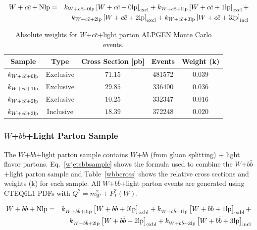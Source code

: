 \begin{eqnarray}
\label{wcc}
\nonumber
W+c\bar{c}+\rm{Nlp} &=& k_{W+c\bar{c}+0\rm{lp}} \left[W+c\bar{c}+0\rm{lp}\right]_{\rm{excl}} + k_{W+c\bar{c}+1\rm{lp}} \left[W+c\bar{c}+1\rm{lp}\right]_{\rm{excl}} + \\
& & k_{W+c\bar{c}+2\rm{lp}} \left[W+c\bar{c}+2\rm{lp}\right]_{\rm{excl}} + k_{W+c\bar{c}+3\rm{lp}} \left[W+c\bar{c}+3\rm{lp}\right]_{\rm{incl}}
\end{eqnarray}


\begin{table}[!h!tbp]
\begin{center}
\caption{Absolute weights for $W$+$c\bar{c}$+light parton ALPGEN Monte Carlo events.}
\label{wcccross}
\begin{tabular}{c|cccc}
Sample					&	Type		&	Cross Section [pb]	&	Events	&	Weight (k) \\
\hline
$k_{W+c\bar{c}+0\rm{lp}}$	&	Exclusive	&	$71.15$			&	481572	&	$0.039$			\\
$k_{W+c\bar{c}+1\rm{lp}}$	&	Exclusive	&	$29.85$			&	336400	&	$0.036$			\\
$k_{W+c\bar{c}+2\rm{lp}}$	&	Exclusive	&	$10.25$			&	332347	&	$0.016$	\\
$k_{W+c\bar{c}+3\rm{lp}}$	&	Inclusive	&	$18.39$			&	372248	&	$0.020$	\\
\end{tabular}
\vspace{-0.1 in}
\end{center}
\end{table}

\subsubsection{$W$+$b\bar{b}$+Light Parton Sample}

The $W$+$b\bar{b}$+light parton sample contains $W$+$b\bar{b}$ (from gluon splitting) + light flavor partons. Eq.~\ref{wjetsbbsample} shows the formula used to combine the $W$+$b\bar{b}$+light parton sample and Table~\ref{wbbcross} shows the relative cross sections and weights (k) for each sample. All $W$+$b\bar{b}$+light parton events are generated using CTEQ6L1 PDFs with $Q^{2}=m_{W}^{2} + P^{2}_{T}(W)$.


\begin{eqnarray}
\label{wjetsbbsample}
\nonumber
W+b\bar{b}+\rm{Nlp} &=& k_{W+b\bar{b}+0\rm{lp}} \left[W+b\bar{b}+0\rm{lp}\right]_{\rm{exbl}} + k_{W+b\bar{b}+1\rm{lp}} \left[W+b\bar{b}+1\rm{lp}\right]_{\rm{exbl}} + \\
& & k_{W+b\bar{b}+2\rm{lp}} \left[W+b\bar{b}+2\rm{lp}\right]_{\rm{exbl}} + k_{W+b\bar{b}+3\rm{lp}} \left[W+b\bar{b}+3\rm{lp}\right]_{\rm{incl}}
\end{eqnarray}

